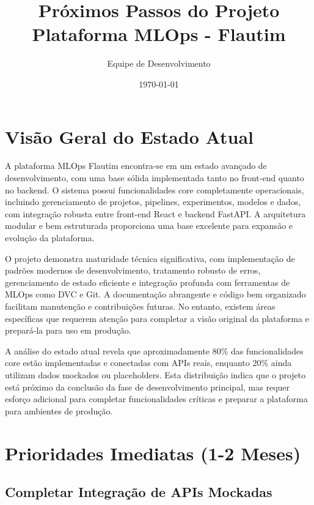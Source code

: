 \documentclass[12pt,a4paper]{article}
\begin{document}
\title{\Huge\textbf{Próximos Passos do Projeto}\\\vspace{0.5cm}\Large Plataforma MLOps - Flautim}
\author{Equipe de Desenvolvimento}
\date{\today}

\maketitle

\tableofcontents
\newpage

\section{Visão Geral do Estado Atual}

A plataforma MLOps Flautim encontra-se em um estado avançado de desenvolvimento, com uma base sólida implementada tanto no front-end quanto no backend. O sistema possui funcionalidades core completamente operacionais, incluindo gerenciamento de projetos, pipelines, experimentos, modelos e dados, com integração robusta entre front-end React e backend FastAPI. A arquitetura modular e bem estruturada proporciona uma base excelente para expansão e evolução da plataforma.

O projeto demonstra maturidade técnica significativa, com implementação de padrões modernos de desenvolvimento, tratamento robusto de erros, gerenciamento de estado eficiente e integração profunda com ferramentas de MLOps como DVC e Git. A documentação abrangente e código bem organizado facilitam manutenção e contribuições futuras. No entanto, existem áreas específicas que requerem atenção para completar a visão original da plataforma e prepará-la para uso em produção.

A análise do estado atual revela que aproximadamente 80\% das funcionalidades core estão implementadas e conectadas com APIs reais, enquanto 20\% ainda utilizam dados mockados ou placeholders. Esta distribuição indica que o projeto está próximo da conclusão da fase de desenvolvimento principal, mas requer esforço adicional para completar funcionalidades críticas e preparar a plataforma para ambientes de produção.

\section{Prioridades Imediatas (1-2 Meses)}

\subsection{Completar Integração de APIs Mockadas}
\end{document}
